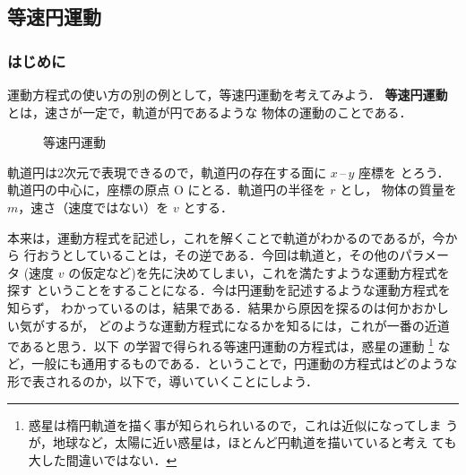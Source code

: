         \subsection{等速円運動}\label{subsec:tousoku_enundou}
            \subsubsection{はじめに}
                運動方程式の使い方の別の例として，等速円運動を考えてみよう．
                \textbf{等速円運動} とは，速さが一定で，軌道が円であるような
                物体の運動のことである．
                        \begin{figure}[hbt]
                            \begin{center}
                                \caption{等速円運動}
                                \label{fig:tousokuenundou}
                            \end{center}
                        \end{figure}

                軌道円は2次元で表現できるので，軌道円の存在する面に $x\,$--$\,y$ 座標を
                とろう．軌道円の中心に，座標の原点 O にとる．軌道円の半径を $r$ とし，
                物体の質量を $m$，速さ（速度ではない）を $v$ とする．

                本来は，運動方程式を記述し，これを解くことで軌道がわかるのであるが，今から
                行おうとしていることは，その逆である．今回は軌道と，その他のパラメータ
                (速度 $v$ の仮定など)を先に決めてしまい，これを満たすような運動方程式を探す
                ということをすることになる．今は円運動を記述するような運動方程式を知らず，
                わかっているのは，結果である．結果から原因を探るのは何かおかしい気がするが，
                どのような運動方程式になるかを知るには，これが一番の近道であると思う．以下
                の学習で得られる等速円運動の方程式は，惑星の運動
                    \footnote{
                        惑星は楕円軌道を描く事が知られられいるので，これは近似になってしま
                        うが，地球など，太陽に近い惑星は，ほとんど円軌道を描いていると考え
                        ても大した間違いではない．
                    }
                など，一般にも通用するものである．ということで，円運動の方程式はどのような
                形で表されるのか，以下で，導いていくことにしよう．

